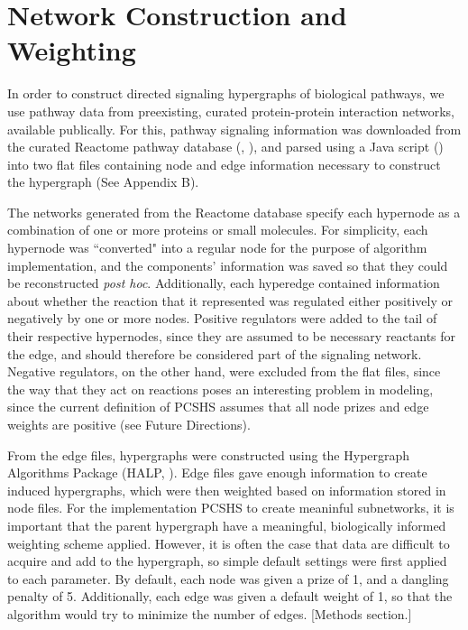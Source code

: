 \documentclass[12pt,twoside]{reedthesis}
\newcommand{\new}[2]{{\color{red}#1 [#2]}}
\theoremstyle{definition}
\begin{document}
  \section{Network Construction and Weighting}
  In order to construct directed signaling hypergraphs of biological pathways, we use pathway data from preexisting, curated protein-protein interaction networks, available publically. For this, pathway signaling information was downloaded from the curated Reactome pathway database (\cite{Croft2014}, \cite{Milacic2012}), and parsed using a Java script (\cite{AnnaCorrespondence}) into two flat files containing node and edge information necessary to construct the hypergraph (See Appendix B).\par
  The networks generated from the Reactome database specify each hypernode as a combination of one or more proteins or small molecules. For simplicity, each hypernode was ``converted" into a regular node for the purpose of algorithm implementation, and the components' information was saved so that they could be reconstructed \textit{post hoc}. Additionally, each hyperedge contained information about whether the reaction that it represented was regulated either positively or negatively by one or more nodes. Positive regulators were added to the tail of their respective hypernodes, since they are assumed to be necessary reactants for the edge, and should therefore be considered part of the signaling network. Negative regulators, on the other hand, were excluded from the flat files, since the way that they act on reactions poses an interesting problem in modeling, since the current definition of PCSHS assumes that all node prizes and edge weights are positive (see Future Directions).\par
  \new{From the edge files, hypergraphs were constructed using the Hypergraph Algorithms Package (HALP, \cite{halp}). Edge files gave enough information to create induced hypergraphs, which were then weighted based on information stored in node files. For the implementation PCSHS to create meaninful subnetworks, it is important that the parent hypergraph have a meaningful, biologically informed weighting scheme applied. However, it is often the case that data are difficult to acquire and add to the hypergraph, so simple default settings were first applied to each parameter. By default, each node was given a prize of 1, and a dangling penalty of 5.  Additionally, each edge was given a default weight of 1, so that the algorithm would try to minimize the number of edges.}{Methods section.}
\end{document}
